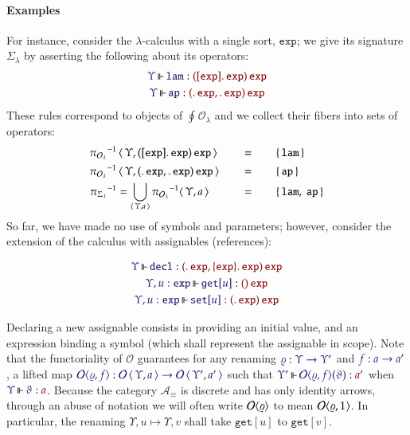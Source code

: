 \documentclass[11pt]{article}
\theoremstyle{definition}
\theoremstyle{remark}
\numberwithin{equation}{section}
\def\IModeColorName{MidnightBlue}
\def\OModeColorName{Maroon}
\newcommand\IMode[1]{{\color{\IModeColorName}{#1}}}
\newcommand\OMode[1]{{\color{\OModeColorName}{#1}}}
\newcommand\MkSet[1]{\left\{\,#1\,\right\}}
\newcommand\Of[2]{\IMode{#1}: \IMode{#2}}
\newcommand\MkValence[3]{%
  \ifthenelse{\equal{#1}{}}{}{%
    \{#1\}%
  }%
  \ifthenelse{\equal{#2}{}}{}{%
    [#2]%
  }.\, #3%
}
\newcommand\MkArity[2]{(#1)\, #2}
\newcommand\ArrId[1]{1_{#1}}
\newcommand\Arities{\mathcal{A}}
\newcommand\Operators{\mathcal{O}}
\newcommand\Discrete[1]{#1_{\equiv}}
\newcommand\IsOperator[3]{
  \IMode{#1}\,{\Vdash}\,\IMode{#2}: \OMode{#3}
}
\newcommand\Grothendieck[2]{\oint^{#1} #2#1}
\newcommand\Pair[2]{\left\langle\,#1,#2\,\right\rangle}
\newcommand\FLift[2]{
  \Operators\langle#1%
  \ifthenelse{\equal{#2}{}}{}{, #2}\rangle%
}
\newcommand\SortExp{\mathtt{exp}}
\begin{document}
\paragraph{Examples}

For instance, consider the $\lambda$-calculus with a single sort, $\SortExp$; we
give its signature $\Sigma_{\lambda}$ by asserting the following about its
operators:
\begin{gather*}
  \IsOperator{\Upsilon}{\mathtt{lam}}{
    \MkArity{\MkValence{}{\SortExp}{\SortExp}}{\SortExp}
  }\\
  \IsOperator{\Upsilon}{\mathtt{ap}}{
    \MkArity{
      \MkValence{}{}{\SortExp},
      \MkValence{}{}{\SortExp}
    }{\SortExp}
  }
\end{gather*}
These rules correspond to objects of $\Grothendieck{}{{\Operators}_{\lambda}}$ and we
collect their fibers into sets of operators:
\begin{alignat*}{5}
{\pi_{{\Operators}_{\lambda}}}^{-1}&\Pair{\Upsilon}{{\MkArity{\MkValence{}{\SortExp}{\SortExp}}{\SortExp}}}\quad&&=
  &&\quad\MkSet{\mathtt{lam}}\\
{\pi_{{\Operators}_{\lambda}}}^{-1}&\Pair{\Upsilon}{\MkArity{\MkValence{}{}{\SortExp},\MkValence{}{}{\SortExp}}{\SortExp}}\quad&&=
  &&\quad\MkSet{\mathtt{ap}}\\
{\pi_{{\Sigma}_{\lambda}}}^{-1}&=\bigcup_{\Pair{\Upsilon}{a}}{{\pi_{{\Operators}_{\lambda}}}^{-1}{\Pair{\Upsilon}{a}}}\quad&&=
  &&\quad\MkSet{\mathtt{lam},\ \mathtt{ap}}\\
\end{alignat*}
So far, we have made no use of symbols and parameters; however, consider the
extension of the calculus with assignables (references):

\begin{gather*}
  \IsOperator{\Upsilon}{\mathtt{decl}}{
    \MkArity{
      \MkValence{}{}{\SortExp},
      \MkValence{\SortExp}{}{\SortExp}
    }{
      \SortExp
    }
  }\\
  \IsOperator{\Upsilon,u:\SortExp}{\mathtt{get}[u]}{
    \MkArity{}{\SortExp}
  }\\
  \IsOperator{\Upsilon,u:\SortExp}{\mathtt{set}[u]}{
    \MkArity{
      \MkValence{}{}{\SortExp}
    }{
      \SortExp
    }
  }
\end{gather*}

Declaring a new assignable consists in providing an initial value, and an
expression binding a symbol (which shall represent the assignable in scope).
Note that the functoriality of $\Operators$ guarantees for any renaming
$\Of{\varrho}{\Upsilon\to\Upsilon'}$ and $\Of{f}{a\to a'}$, a lifted map
$\Of{\FLift{\varrho}{f}}{\Operators\Pair{\Upsilon}{a}\to\Operators\Pair{\Upsilon'}{a'}}$
such that $\IsOperator{\Upsilon'}{\FLift{\varrho}{f}(\vartheta)}{a'}$ when
$\IsOperator{\Upsilon}{\vartheta}{a}$. Because the category
$\Discrete{\Arities}$ is discrete and has only identity arrows, through an abuse
of notation we will often write $\FLift{\varrho}{}$ to mean
$\FLift{\varrho}{\ArrId{}}$. In particular, the renaming
$\Upsilon,u\mapsto\Upsilon,v$ shall take $\mathtt{get}[u]$ to $\mathtt{get}[v]$.
\end{document}
